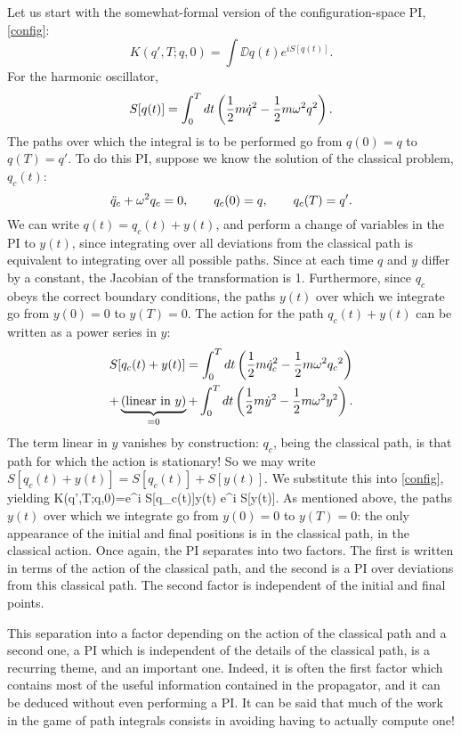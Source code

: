 \documentclass[12pt]{article}
\begin{document}
Let us start with the
somewhat-formal version of the configuration-space PI,
\eqref{config}:
\[ K(q',T;q,0)=\int\DD q(t) e^{i S[q(t)]}.
\]
For the harmonic oscillator,
\[ S[q(t)]=\int_0^T dt\left({\frac 12} m{\dot q}^2 
-{\frac 12} m{\omega}^2q^2 \right).
\]
The paths over which the integral is to
be performed go from $q(0)=q$ to
$q(T)=q'$. To do this PI, suppose we know the solution of the
classical problem, $q_c(t)$:
\[{\ddot q}_c+{\omega}^2q_c=0,\qquad q_c(0)=q,\qquad q_c(T)=q'.\]
We can write $q(t)=q_c(t)+y(t)$, and perform a change of variables in
the PI to $y(t)$, since integrating over all deviations from the
classical path is equivalent to integrating over all possible
paths. Since at each time $q$ and $y$ differ by a constant,
the Jacobian of the transformation is 1. Furthermore, since $q_c$
obeys the correct boundary conditions, the paths $y(t)$ over which we
integrate go from $y(0)=0$ to $y(T)=0$.
The action for the path $q_c(t)+y(t)$ can be
written as a power series in $y$:
\begin{multline*}
S[q_c(t)+y(t)] = \int_0^T dt\left({\frac 12} m{{\dot q}_c}^2
-{\frac 12} m{\omega}^2{q_c}^2\right)\\
+\underbrace{(\mbox{linear in $y$})}_{=0}
+\int_0^T dt \left({\frac 12} m {\dot y}^2
-{\frac 12} m{\omega}^2 y^2\right).
\end{multline*}
The term linear in $y$ vanishes by construction:
$q_c$, being the classical path, is that path for which the action is
stationary! So we may write
$S[q_c(t)+y(t)]=S[q_c(t)]+S[y(t)]$. We substitute this into
\eqref{config}, yielding
\beq
K(q',T;q,0)=e^{i S[q_c(t)]}\int\DD y(t) e^{i S[y(t)]}.
\label{harmosc1}\eeq
As mentioned above, the paths $y(t)$ over which we integrate
go from $y(0)=0$ to $y(T)=0$: the only appearance of the
initial and final positions is in the classical path, \ie in the
classical action. Once again, the PI separates 
into two factors. The first is written in terms of
the action of the classical path, and the second is a PI
over deviations from this classical path. The second factor is
independent of the initial and final points.

This separation into a factor depending on the
action of the classical path and a second one, a PI which
is independent of the details of the classical
path, is a recurring theme, and an important one.
Indeed, it is often the first
factor which contains most of the useful information contained
in the propagator,
and it can be deduced without even
performing a PI. It can be said that much of the work in
the game of path integrals consists
in avoiding having to actually compute one!
\end{document}
